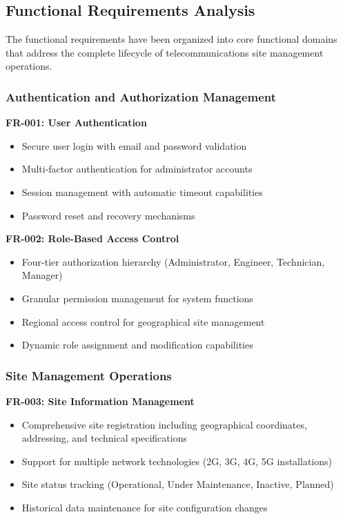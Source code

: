 \subsection{Functional Requirements Analysis}

The functional requirements have been organized into core functional domains that address the complete lifecycle of telecommunications site management operations.

\subsubsection{Authentication and Authorization Management}
\textbf{FR-001: User Authentication}
\begin{itemize}
\item Secure user login with email and password validation
\item Multi-factor authentication for administrator accounts
\item Session management with automatic timeout capabilities
\item Password reset and recovery mechanisms
\end{itemize}

\textbf{FR-002: Role-Based Access Control}
\begin{itemize}
\item Four-tier authorization hierarchy (Administrator, Engineer, Technician, Manager)
\item Granular permission management for system functions
\item Regional access control for geographical site management
\item Dynamic role assignment and modification capabilities
\end{itemize}

\subsubsection{Site Management Operations}
\textbf{FR-003: Site Information Management}
\begin{itemize}
\item Comprehensive site registration including geographical coordinates, addressing, and technical specifications
\item Support for multiple network technologies (2G, 3G, 4G, 5G installations)
\item Site status tracking (Operational, Under Maintenance, Inactive, Planned)
\item Historical data maintenance for site configuration changes
\end{itemize}


